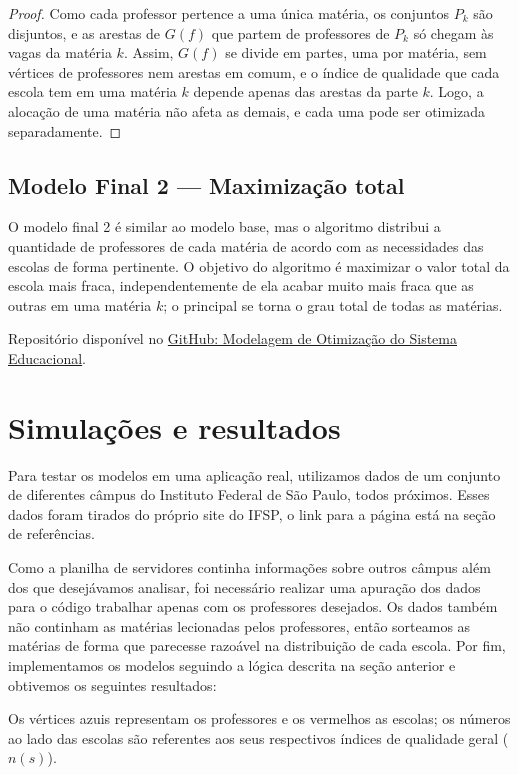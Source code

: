 \documentclass[12pt,a4paper]{article}
\begin{document}
\begin{proof}
Como cada professor pertence a uma única matéria, os conjuntos $P_k$ são disjuntos, e as arestas de $G(f)$ que partem de professores de $P_k$ só chegam às vagas da matéria $k$. Assim, $G(f)$ se divide em partes, uma por matéria, sem vértices de professores nem arestas em comum, e o índice de qualidade que cada escola tem em uma matéria $k$ depende apenas das arestas da parte $k$. Logo, a alocação de uma matéria não afeta as demais, e cada uma pode ser otimizada separadamente.
\end{proof}

\subsection{Modelo Final 2 --- Maximização total}

O modelo final 2 é similar ao modelo base, mas o algoritmo distribui a quantidade de professores de cada matéria de acordo com as necessidades das escolas de forma pertinente. O objetivo do algoritmo é maximizar o valor total da escola mais fraca, independentemente de ela acabar muito mais fraca que as outras em uma matéria $k$; o principal se torna o grau total de todas as matérias.

Repositório disponível no \href{https://github.com/LeozinRuiz/Modelagem-de-Otimiza-o-do-Sistema-Educacional}{GitHub: Modelagem de Otimização do Sistema Educacional}.


\section{Simulações e resultados}

Para testar os modelos em uma aplicação real, utilizamos dados de um conjunto de diferentes câmpus do Instituto Federal de São Paulo, todos próximos. Esses dados foram tirados do próprio site do IFSP, o link para a página está na seção de referências.

Como a planilha de servidores continha informações sobre outros câmpus além dos que desejávamos analisar, foi necessário realizar uma apuração dos dados para o código trabalhar apenas com os professores desejados. Os dados também não continham as matérias lecionadas pelos professores, então sorteamos as matérias de forma que parecesse razoável na distribuição de cada escola. Por fim, implementamos os modelos seguindo a lógica descrita na seção anterior e obtivemos os seguintes resultados:

Os vértices azuis representam os professores e os vermelhos as escolas; os números ao lado das escolas são referentes aos seus respectivos índices de qualidade geral ($n(s)$).
\end{document}
